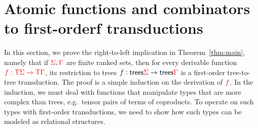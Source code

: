 \newcommand{\Root}[1]{\mathsf{root}_{#1}}
\newcommand{\Port}[1]{\mathsf{port}_{#1}}
\newcommand{\Interface}[1]{\mathsf{Interface}_{#1}}
\section{Atomic functions and combinators to first-orderf transductions}
\label{sec:to-transductions}
In this section, we prove the right-to-left implication in Theorem~\ref{thm:main}, namely that if ${\color{red}{\Sigma}},{\color{red}{\Gamma}}$ are finite ranked sets, then for every derivable function ${\color{red}{f : {\color{red}{\mathsf T}}{\color{red}{\Sigma}}\to {\color{red}{\mathsf T}}{\color{red}{\Gamma}}}}$, its restriction to trees $f : \mathsf {trees} {\color{red}{\Sigma}} \to \mathsf {trees} {\color{red}{\Gamma}}$
is a first-order tree-to-tree transduction. The proof is a simple induction on the derivation of  ${\color{red}{f}}$. In the induction, we must deal with functions that manipulate types that are more complex than trees, e.g.~tensor pairs of terms of coproducts.  To operate on such types with first-order transductions, we need to show how such types can be modeled as relational structures.




